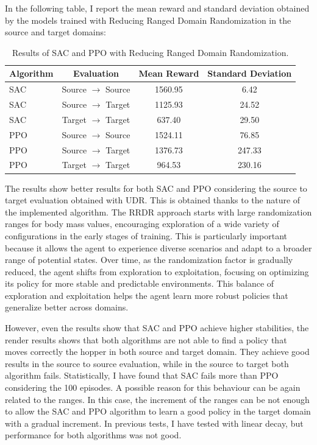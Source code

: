 \documentclass[11pt]{article}
\begin{document}
In the following table, I report the mean reward and standard deviation obtained by the models trained with Reducing Ranged Domain Randomization in the source and target domains:

\begin{table}[H]
    \centering
    \begin{tabular}{|l|c|c|c|}
        \hline
        \textbf{Algorithm} & \textbf{Evaluation} & \textbf{Mean Reward} & \textbf{Standard Deviation} \\ \hline
        SAC & Source $\rightarrow$ Source & 1560.95 & 6.42 \\ 
        SAC & Source $\rightarrow$ Target & 1125.93 & 24.52 \\ 
        SAC & Target $\rightarrow$ Target & 637.40 & 29.50 \\ \hline
        PPO & Source $\rightarrow$ Source & 1524.11 & 76.85 \\ 
        PPO & Source $\rightarrow$ Target & 1376.73 & 247.33 \\ 
        PPO & Target $\rightarrow$ Target & 964.53 & 230.16 \\ \hline
    \end{tabular}
    \caption{Results of SAC and PPO with Reducing Ranged Domain Randomization.}
    \label{tab:results_rrdr}
\end{table}

The results show better results for both SAC and PPO considering the source to target evaluation obtained with UDR. This is obtained thanks to the nature of the implemented algorithm. The RRDR approach starts with large randomization ranges for body mass values, encouraging exploration of a wide variety of configurations in the early stages of training. This is particularly important because it allows the agent to experience diverse scenarios and adapt to a broader range of potential states. Over time, as the randomization factor is gradually reduced, the agent shifts from exploration to exploitation, focusing on optimizing its policy for more stable and predictable environments. This balance of exploration and exploitation helps the agent learn more robust policies that generalize better across domains.

However, even the results show that SAC and PPO achieve higher stabilities, the render results shows that both algorithms are not able to find a policy that moves correctly the hopper in both source and target domain. They achieve good results in the source to source evaluation, while in the source to target both algorithm fails. Statistically, I have found that SAC fails more than PPO considering the 100 episodes. A possible reason for this behaviour can be again related to the ranges. In this case, the increment of the ranges can be not enough to allow the SAC and PPO algorithm to learn a good policy in the target domain with a gradual increment. In previous tests, I have tested with linear decay, but performance for both algorithms was not good.
\end{document}

